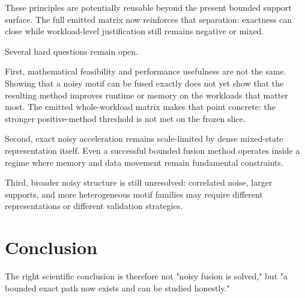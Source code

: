 These principles are potentially reusable beyond the present bounded support
surface. The full emitted matrix now reinforces that separation: exactness can
close while workload-level justification still remains negative or mixed.

Several hard questions remain open.

First, mathematical feasibility and performance usefulness are not the same.
Showing that a noisy motif can be fused exactly does not yet show that the
resulting method improves runtime or memory on the workloads that matter most.
The emitted whole-workload matrix makes that point concrete: the stronger
positive-method threshold is not met on the frozen slice.

Second, exact noisy acceleration remains scale-limited by dense mixed-state
representation itself. Even a successful bounded fusion method operates inside a
regime where memory and data movement remain fundamental constraints.

Third, broader noisy structure is still unresolved: correlated noise, larger
supports, and more heterogeneous motif families may require different
representations or different validation strategies.

\section{Conclusion}

The right scientific conclusion is therefore not "noisy fusion is solved," but
"a bounded exact path now exists and can be studied honestly."

